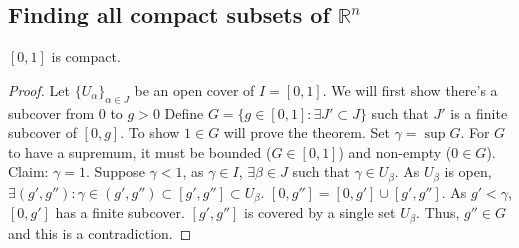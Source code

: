 \documentclass[a4paper]{article}
\numberwithin{equation}{section}
\newcommand{\R}{\mathbb{R}}
\begin{document}
\subsection{Finding all compact subsets of $\R^n$}
\begin{theorem}
    $[0,1]$ is compact.
    \begin{proof}
        Let $\{U_\alpha\}_{\alpha\in J}$ be an open cover of $I=[0,1]$. We will first show there's a subcover from 0 to $g>0$
        \vspace{10pt}
        Define $G=\{g\in[0,1]: \exists J'\subset J\}$ such that $J'$ is a finite subcover of $[0,g]$. 
        \vspace{10pt}
        To show $1\in G$ will prove the theorem.
        \vspace{10pt}
        Set $\gamma=\sup G$. For $G$ to have a supremum, it must be bounded ($G\in[0,1]$) and non-empty ($0\in G$). 
        \vspace{10pt}
        Claim: $\gamma=1$. Suppose $\gamma<1$, as $\gamma\in I$, $\exists\beta\in J$ such that $\gamma\in U_\beta$.
        \vspace{10pt}
        As $U_\beta$ is open, $\exists (g',g''): \gamma\in(g',g'')\subset[g',g'']\subset U_\beta$.
        \vspace{10pt}
        $[0,g'']=[0,g']\cup[g',g'']$.
        As $g'<\gamma$, $[0,g']$ has a finite subcover. $[g',g'']$ is covered by a single set $U_\beta$. Thus, $g''\in G$ and this is a contradiction.
    \end{proof}
\end{theorem}
\end{document}
